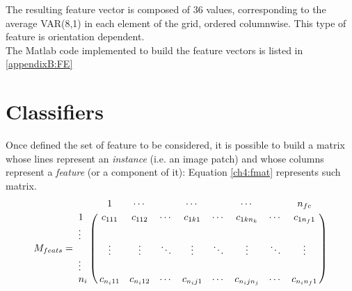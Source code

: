 The resulting feature vector is composed of 36 values, corresponding to the average VAR(8,1) in each element of the grid, ordered columnwise. This type of feature is orientation dependent.
\\
The Matlab code implemented to build the feature vectors is listed in \ref{appendixB:FE}






\vspace{0.5cm}


\section{Classifiers}
\label{ch4:classifiers}

Once defined the set of feature to be considered, it is possible to build a matrix whose lines represent an \textit{instance} (i.e. an image patch) and whose columns represent a \textit{feature}
(or a component of it): Equation \ref{ch4:fmat} represents such matrix.
\begin{equation}
\label{ch4:fmat}
 M_{feats} = \\ \bordermatrix{~ & \tikzmark{harrowleft} 1 & \cdots & ~  & \cdots & ~ & \cdots & ~ & n_{fc}\tikzmark{harrowright}  \cr
			      \tikzmark{varrowtop} 1 & c_{111} & c_{112} & \cdots & c_{1k1} & \cdots & c_{1kn_k} & \cdots & c_{1n_f1} \cr
			                      \vdots &    ~    &   ~     &   ~    &    ~    &   ~    &     ~     &    ~   &     ~     \cr
			                       ~     & \vdots  & \vdots  & \ddots & \vdots  & \ddots & \vdots    & \ddots &  \vdots   \cr
			                      \vdots &    ~    &   ~     &   ~    &   ~     &   ~    &    ~      &    ~   &    ~      \cr
			      \tikzmark{varrowbottom} n_i & \tikzmark{f1} c_{n_i11} & c_{n_i12} \tikzmark{f2} & \cdots & \tikzmark{f3} c_{n_ij1} & \cdots & c_{n_ijn_j} \tikzmark{f4} & \cdots & \tikzmark{f5} c_{n_in_f1} \tikzmark{f6} \cr
			     }
\end{equation}

